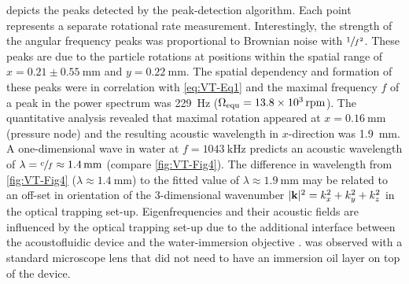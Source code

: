  depicts the peaks detected by the peak-detection algorithm. 
Each point represents a separate rotational rate measurement. Interestingly, the 
strength of the angular frequency peaks was proportional to Brownian noise with 
$\sfrac{1}{f^2}$. These peaks are due to the particle rotations at positions 
within the spatial range of $x=0.21\pm\SI{0.55}{\mm}$ and $y=\SI{0.22}{\mm}$.  
The spatial dependency and formation of these peaks were in correlation with 
\cref{eq:VT-Eq1} and the maximal frequency $f$ of a peak in the power spectrum was 
\SI{229}{\hertz} ($ \Omega_{\mathrm{equ}} = \SI{13.8e3}{rpm} $). The quantitative 
analysis revealed that maximal rotation appeared at $x=\SI{0.16}{\mm}$ (pressure 
node) and the resulting acoustic wavelength in $x$-direction was \SI{1.9}{\mm}.  
A one-dimensional wave in water at $f=\SI{1043}{\kilo\hertz}$ predicts an 
acoustic wavelength of $\lambda = \sfrac{c}{f} \approx \SI{1.4}{\mm}$ (compare 
\cref{fig:VT-Fig4}). The difference in wavelength from \cref{fig:VT-Fig4} 
($\lambda \approx \SI{1.4}{\mm} $) to the fitted value of $\lambda \approx 
\SI{1.9}{\mm} $ may be related to an off-set in orientation of the 
3-dimensional wavenumber $|\vb{k}|^{2} = k^{2}_{x} + k^{2}_{y} + k^{2}_{z}$ in 
the optical trapping set-up. Eigenfrequencies and their acoustic fields are 
influenced by the optical trapping set-up due to the additional interface 
between the acoustofluidic device and the water-immersion objective 
\cite{Lamprecht2016}.   was observed with a standard 
microscope lens that did not need to have an immersion oil layer on top of the 
device.

